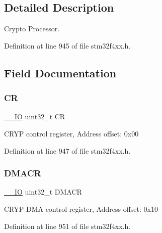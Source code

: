 \subsection{Detailed Description}
Crypto Processor. 

Definition at line 945 of file stm32f4xx.\+h.



\subsection{Field Documentation}
\mbox{\label{struct_c_r_y_p___type_def_ab40c89c59391aaa9d9a8ec011dd0907a}} 
\subsubsection{\texorpdfstring{CR}{CR}}
{\footnotesize\ttfamily \hyperlink{group___c_m_s_i_s__core__definitions_gaec43007d9998a0a0e01faede4133d6be}{\+\_\+\+\_\+\+IO} uint32\+\_\+t CR}

C\+R\+YP control register, Address offset\+: 0x00 

Definition at line 947 of file stm32f4xx.\+h.

\mbox{\label{struct_c_r_y_p___type_def_a082219a924d748e9c6092582aec06226}} 
\subsubsection{\texorpdfstring{D\+M\+A\+CR}{DMACR}}
{\footnotesize\ttfamily \hyperlink{group___c_m_s_i_s__core__definitions_gaec43007d9998a0a0e01faede4133d6be}{\+\_\+\+\_\+\+IO} uint32\+\_\+t D\+M\+A\+CR}

C\+R\+YP D\+MA control register, Address offset\+: 0x10 

Definition at line 951 of file stm32f4xx.\+h.

\mbox{\label{struct_c_r_y_p___type_def_ab8ba768d1dac54a845084bd07f4ef2b9}} 
